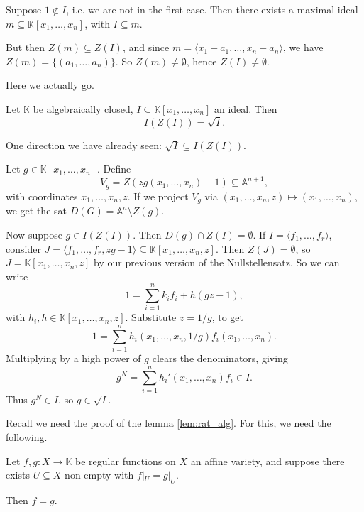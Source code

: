 \documentclass[12pt]{article}
\begin{document}
\begin{proofbox}
	Suppose $1 \not \in I$, i.e. we are not in the first case. Then there exists a maximal ideal $m \subseteq \mathbb{K}[x_1, \ldots, x_n]$, with $I \subseteq m$.

	But then $Z(m) \subseteq Z(I)$, and since $m = \langle x_1 - a_1, \ldots, x_n - a_n \rangle$, we have $Z(m) = \{(a_1, \ldots, a_n)\}$. So $Z(m) \neq \emptyset$, hence $Z(I) \neq \emptyset$.
\end{proofbox}

Here we actually go.

\begin{theorem}
	Let $\mathbb{K}$ be algebraically closed, $I \subseteq \mathbb{K}[x_1, \ldots, x_n]$ an ideal. Then
	\[
	I(Z(I)) = \sqrt I.
	\]
\end{theorem}

\begin{proofbox}
	One direction we have already seen: $\sqrt I \subseteq I(Z(I))$.

	Let $g \in \mathbb{K}[x_1, \ldots, x_n]$. Define
	\[
	V_g = Z(z g(x_1, \ldots, x_n) - 1) \subseteq \mathbb{A}^{n+1},
	\]
	with coordinates $x_1, \ldots, x_n, z$. If we project $V_g$ via $(x_1, \ldots, x_n, z) \mapsto (x_1, \ldots, x_n)$, we get the sat $D(G) = \mathbb{A}^n \setminus Z(g)$.

	Now suppose $g \in I(Z(I))$. Then $D(g) \cap Z(I) = \emptyset$. If $I = \langle f_1, \ldots, f_r \rangle$, consider $J = \langle f_1, \ldots, f_r, zg - 1\rangle \subseteq \mathbb{K}[x_1, \ldots, x_n, z]$. Then $Z(J) = \emptyset$, so $J = \mathbb{K}[x_1, \ldots, x_n, z]$ by our previous version of the Nullstellensatz. So we can write
	\[
	1 = \sum_{i = 1}^n k_i f_i + h (gz - 1),
	\]
	with $h_i, h \in \mathbb{K}[x_1, \ldots, x_n, z]$. Substitute $z = 1/g$, to get
	\[
	1 = \sum_{i = 1}^n h_i(x_1, \ldots, x_n, 1/g) f_i(x_1, \ldots, x_n).
	\]
	Multiplying by a high power of $g$ clears the denominators, giving
	\[
	g^N = \sum_{i = 1}^n h_i'(x_1, \ldots, x_n) f_i \in I.
	\]
	Thus $g^N \in I$, so $g \in \sqrt I$.
\end{proofbox}

Recall we need the proof of the lemma \ref{lem:rat_alg}. For this, we need the following.

\begin{lemma}
	Let $f, g : X \to \mathbb{K}$ be regular functions on $X$ an affine variety, and suppose there exists $U \subseteq X$ non-empty with $f|_U = g|_U$.

	Then $f = g$.
\end{lemma}
\end{document}
